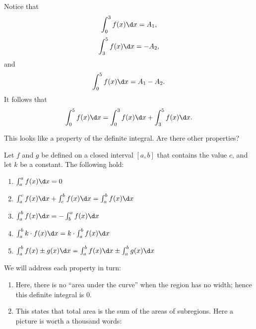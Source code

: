 \documentclass{ximera}
\begin{document}
Notice that 
\[
 \int_0^3 f(x) \d x= A_1,
 \]
 \[
 \int_3^5 f(x) \d x=-A_2,
 \]
and
\[
\int_0^5 f(x) \d x=A_1-A_2.
\]
It follows that
 \[
\int_0^5 f(x) \d x= \int_0^3 f(x) \d x+ \int_3^5 f(x) \d x.
\]

This looks like a property of the definite integral. Are there other properties?

\begin{theorem}
Let $f$ and $g$ be defined on a closed interval $[a,b]$ that contains the
value $c$, and let $k$ be a constant. The following
hold:
\begin{enumerate}
\item $\int_a^a f(x)\d x = 0$
\item $\int_a^c f(x)\d x + \int_c^b f(x)\d x = \int_a^b f(x)\d x$
\item $\int_a^bf(x)\d x = -\int_b^a f(x)\d x$
\item $\int_a^bk\cdot f(x)\d x = k\cdot\int_a^bf(x)\d x$
\item $\int_a^b f(x)\pm g(x)\d x = \int_a^bf(x)\d x \pm \int_a^bg(x)\d x$
\end{enumerate}
\begin{explanation}
  We will address each property in turn:
\begin{enumerate}
\item Here, there is no ``area under the curve'' when the region has
  no width; hence this definite integral is $0$.
\item This states that total area is the sum of the areas of
  subregions. Here a picture is worth a thousand words:
  \begin{image}
\end{image}
\end{enumerate}
\end{explanation}
\end{theorem}
\end{document}
